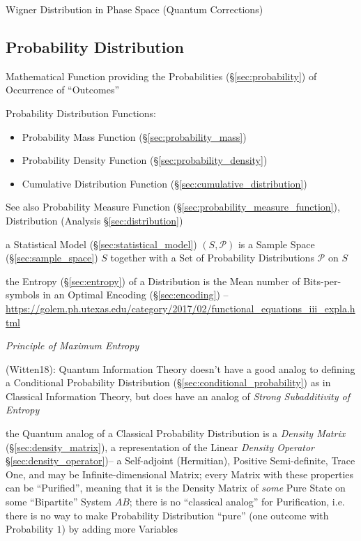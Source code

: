 Wigner Distribution in Phase Space (Quantum Corrections)



\subsection{Probability Distribution}
\label{sec:probability_distribution}

Mathematical Function providing the Probabilities (\S\ref{sec:probability}) of
Occurrence of ``Outcomes''

Probability Distribution Functions:
\begin{itemize}
  \item Probability Mass Function (\S\ref{sec:probability_mass})
  \item Probability Density Function (\S\ref{sec:probability_density})
  \item Cumulative Distribution Function
    (\S\ref{sec:cumulative_distribution})
\end{itemize}
See also Probability Measure Function
(\S\ref{sec:probability_measure_function}), Distribution (Analysis
\S\ref{sec:distribution})

a Statistical Model (\S\ref{sec:statistical_model}) $(S,\mathcal{P})$ is a
Sample Space (\S\ref{sec:sample_space}) $S$ together with a Set of Probability
Distributions $\mathcal{P}$ on $S$

the Entropy (\S\ref{sec:entropy}) of a Distribution is the Mean number
of Bits-per-symbols in an Optimal Encoding (\S\ref{sec:encoding}) --
\url{https://golem.ph.utexas.edu/category/2017/02/functional_equations_iii_expla.html}

\emph{Principle of Maximum Entropy}

(Witten18): Quantum Information Theory doesn't have a good analog to defining a
Conditional Probability Distribution (\S\ref{sec:conditional_probability}) as in
Classical Information Theory, but does have an analog of \emph{Strong
  Subadditivity of Entropy}

the Quantum analog of a Classical Probability Distribution is a \emph{Density
  Matrix} (\S\ref{sec:density_matrix}), a representation of the Linear
\emph{Density Operator} \S\ref{sec:density_operator})-- a Self-adjoint
(Hermitian), Positive Semi-definite, Trace One, and may be Infinite-dimensional
Matrix; every Matrix with these properties can be ``Purified'', meaning that it
is the Density Matrix of \emph{some} Pure State on some ``Bipartite'' System
$AB$; there is no ``classical analog'' for Purification, i.e. there is no way to
make Probability Distribution ``pure'' (one outcome with Probability $1$) by
adding more Variables



